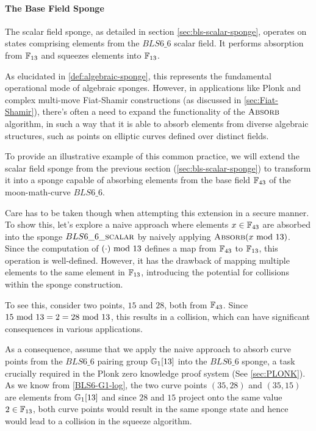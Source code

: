 \paragraph{The Base Field Sponge} The scalar field sponge, as detailed in section \ref{sec:bls-scalar-sponge}, operates on states comprising elements from the $BLS6\_6$ scalar field. It performs absorption from $\mathbb{F}_{13}$ and squeezes elements into $\mathbb{F}_{13}$.

As elucidated in \ref{def:algebraic-sponge}, this represents the fundamental operational mode of algebraic sponges. However, in applications like Plonk and complex multi-move Fiat-Shamir constructions (as discussed in \ref{sec:Fiat-Shamir}), there's often a need to expand the functionality of the $\textsc{Absorb}$ algorithm, in such a way that it is able to absorb elements from diverse algebraic structures, such as points on elliptic curves defined over distinct fields.

To provide an illustrative example of this common practice, we will extend the scalar field sponge from the previous section (\ref{sec:bls-scalar-sponge}) to transform it into a sponge capable of absorbing elements from the base field $\mathbb{F}_{43}$ of the moon-math-curve $BLS6\_6$.   

Care has to be taken though when attempting this extension in a secure manner. To show this, let's explore a naive approach where elements $x\in \mathbb{F}_{43}$ are absorbed into the sponge $BLS6\_6\_\textsc{scalar}$ by naively applying $\textsc{Absorb}(x \text{ mod } 13)$. Since the computation of $(\cdot) \text{ mod } 13$ defines a map from $\mathbb{F}_{43}$ to $\mathbb{F}_{13}$, this operation is well-defined. However, it has the drawback of mapping multiple elements to the same element in $\mathbb{F}_{13}$, introducing the potential for collisions within the sponge construction.

To see this, consider two points, $15$ and $28$, both from $\mathbb{F}_{43}$. Since $15 \text{ mod } 13=2=28 \text{ mod } 13$, this results in a collision, which can have significant consequences in various applications.

As a consequence, assume that we apply the naive approach to absorb curve points from the $BLS6\_6$ pairing group $\mathbb{G}_1[13]$ into the $BLS6\_6$ sponge, a task crucially required in the Plonk zero knowledge proof system (See \ref{sec:PLONK}). As we know from \ref{BLS6-G1-log}, the two curve points $(35, 28)$ and $(35, 15)$ are elements from $\mathbb{G}_1[13]$ and since $28$ and $15$ project onto the same value $2\in \mathbb{F}_{13}$, both curve points would result in the same sponge state and hence would lead to a collision in the squeeze algorithm.


